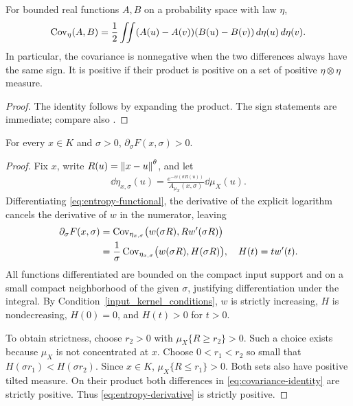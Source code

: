 \begin{lemma}\label{lem:covariance}
For bounded real functions $A,B$ on a probability space with law $\eta$,
\begin{align}\label{eq:covariance-identity}
\operatorname{Cov}_\eta(A,B)=\frac12\iint(A(u)-A(v))(B(u)-B(v))\,d\eta(u)\,d\eta(v).
\end{align}
In particular, the covariance is nonnegative when the two differences always have the same sign. It is positive if their product is positive on a set of positive $\eta\otimes\eta$ measure.
\end{lemma}
\begin{proof}
The identity follows by expanding the product. The sign statements are immediate; compare also \cite{liu2000inequ}.
\end{proof}

\begin{lemma}\label{lem:entropy-monotone}
For every $x\in K$ and $\sigma>0$, $\partial_\sigma F(x,\sigma)>0$.
\end{lemma}
\begin{proof}
Fix $x$, write $R(u)=\left\lVert x-u\right\rVert^\theta$, and let
\begin{align}
\dd\eta_{x,\sigma}(u)=\frac{e^{-w(\sigma R(u))}}{A_{\mu_X}(x,\sigma)}\dd\mu_X(u).
\end{align}
Differentiating \eqref{eq:entropy-functional}, the derivative of the explicit logarithm cancels the derivative of $w$ in the numerator, leaving
\begin{align}\label{eq:entropy-derivative}
\partial_\sigma F(x,\sigma)
&=\operatorname{Cov}_{\eta_{x,\sigma}}\bigl(w(\sigma R),R w'(\sigma R)\bigr)\\
&=\frac1\sigma\operatorname{Cov}_{\eta_{x,\sigma}}
\bigl(w(\sigma R),H(\sigma R)\bigr),\quad H(t)=tw'(t).\nonumber
\end{align}
All functions differentiated are bounded on the compact input support and on a small compact neighborhood of the given $\sigma$, justifying differentiation under the integral. By Condition~\ref{input_kernel_conditions}, $w$ is strictly increasing, $H$ is nondecreasing, $H(0)=0$, and $H(t)>0$ for $t>0$.

To obtain strictness, choose $r_2>0$ with $\mu_X\{R\geq r_2\}>0$. Such a choice exists because $\mu_X$ is not concentrated at $x$. Choose $0<r_1<r_2$ so small that $H(\sigma r_1)<H(\sigma r_2)$. Since $x\in K$, $\mu_X\{R\leq r_1\}>0$. Both sets also have positive tilted measure. On their product both differences in \eqref{eq:covariance-identity} are strictly positive. Thus \eqref{eq:entropy-derivative} is strictly positive.
\end{proof}


